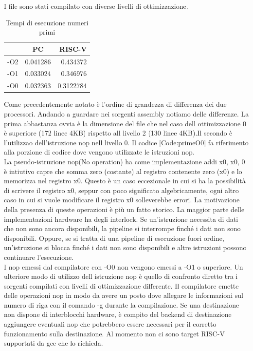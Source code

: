 \documentclass[12pt,a4paper]{report}
\begin{document}


I file sono stati compilato con diverse livelli di ottimizzazione.
\begin{table}[h]
\begin{tabular}{|l|c|r|}
\hline
    & PC       & RISC-V    \\ \hline
-O2 & 0.041286 & 0.434372  \\ \hline
-O1 & 0.033024 & 0.346976  \\ \hline
-O0 & 0.032363 & 0.3122784 \\ \hline
\end{tabular}
\caption{Tempi di esecuzione numeri primi}
\label{Tab:TempoPrime}
\end{table}
Come precedentemente notato è l'ordine di grandezza di differenza dei due processori. Andando a guardare nei sorgenti assembly notiamo delle differenze. La prima abbastanza ovvia è la dimensione del file che nel caso dell ottimizzazione 0 è superiore (172 linee 4KB) rispetto all livello 2 (130 linee 4KB).Il secondo è l'utilizzao dell'istruzione nop nell livello 0.
Il codice \ref{Code:primeO0} fa riferimento alla porzione di codice dove vengono utilizzate le istruzioni nop.\\



La pseudo-istruzione nop(No operation) ha come implementazione addi x0, x0, 0 è intiutivo capre che somma zero (costante) al registro contenente zero (x0) e lo memorizza nel registro x0. Questo è un caso eccezionale in cui si ha la possibilità di scrivere il registro x0, seppur con poco significato algebricamente, ogni altro caso in cui si vuole modificare il registro x0 solleverebbe errori. La motivazione della presenza di queste operazioni è più un fatto storico.
La maggior parte delle implementazioni hardware ha degli interlock. Se un'istruzione necessita di dati che non sono ancora disponibili, la pipeline si interrompe finché i dati non sono disponibili. Oppure, se si tratta di una pipeline di esecuzione fuori ordine, un'istruzione si blocca finché i dati non sono disponibili e altre istruzioni possono continuare l'esecuzione.\\
I nop emessi dal compilatore con -O0  non vengono emessi a -O1 o superiore. Un ulteriore modo di utilizzo dell istruzione nop è quello di confronto diretto tra i sorgenti compilati con livelli di ottimizzazione differente. Il compilatore emette delle operazioni nop  in modo da avere un posto dove allegare le informazioni sul numero di riga con il comando -g durante la compilazione. Se una destinazione non dispone di interblocchi hardware, è compito del backend di destinazione aggiungere eventuali nop che potrebbero essere necessari per il corretto funzionamento sulla destinazione. Al momento non ci sono target RISC-V supportati da gcc che lo richieda.
\end{document}
